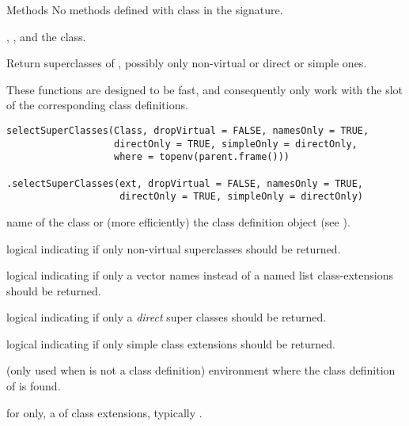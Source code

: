%
\begin{Section}{Methods}
No methods defined with class  in the
signature.
\end{Section}
%
\begin{SeeAlso}\relax
{},
, and the
 class.
\end{SeeAlso}
%
\begin{Description}\relax
Return superclasses of , possibly only non-virtual or
direct or simple ones.

These functions are designed to be fast, and consequently only work
with the  slot of the corresponding class definitions.
\end{Description}
%
\begin{Usage}
\begin{verbatim}
selectSuperClasses(Class, dropVirtual = FALSE, namesOnly = TRUE,
                   directOnly = TRUE, simpleOnly = directOnly,
                   where = topenv(parent.frame()))

.selectSuperClasses(ext, dropVirtual = FALSE, namesOnly = TRUE,
                    directOnly = TRUE, simpleOnly = directOnly)
\end{verbatim}
\end{Usage}
%
\begin{Arguments}
\begin{ldescription}
\item[\code{Class}] name of the class or (more efficiently) the class
definition object (see ).
\item[\code{dropVirtual}] logical indicating if only non-virtual superclasses
should be returned.
\item[\code{namesOnly}] logical indicating if only a vector names instead of
a named list class-extensions should be returned.
\item[\code{directOnly}] logical indicating if only a \emph{direct} super
classes should be returned.
\item[\code{simpleOnly}] logical indicating if only simple class extensions
should be returned.
\item[\code{where}] (only used when  is not a class definition)
environment where the class definition of  is found.
\item[\code{ext}] for  only, a 
of class extensions, typically .
\end{ldescription}
\end{Arguments}
